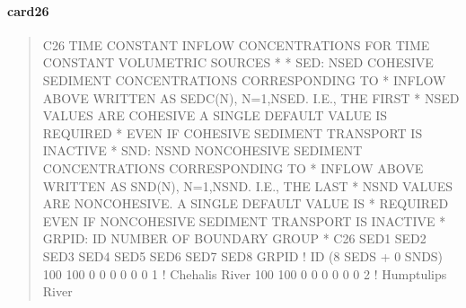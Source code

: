 \documentclass[letterpaper,10pt,english]{sphinxmanual}
\begin{document}
\paragraph{card26}
\label{\detokenize{inputfiles/runcontrol/card26:card26}}\label{\detokenize{inputfiles/runcontrol/card26::doc}}\begin{quote}

\begin{sphinxVerbatim}[commandchars=\\\{\}]
\PYGZhy{}\PYGZhy{}\PYGZhy{}\PYGZhy{}\PYGZhy{}\PYGZhy{}\PYGZhy{}\PYGZhy{}\PYGZhy{}\PYGZhy{}\PYGZhy{}\PYGZhy{}\PYGZhy{}\PYGZhy{}\PYGZhy{}\PYGZhy{}\PYGZhy{}\PYGZhy{}\PYGZhy{}\PYGZhy{}\PYGZhy{}\PYGZhy{}\PYGZhy{}\PYGZhy{}\PYGZhy{}\PYGZhy{}\PYGZhy{}\PYGZhy{}\PYGZhy{}\PYGZhy{}\PYGZhy{}\PYGZhy{}\PYGZhy{}\PYGZhy{}\PYGZhy{}\PYGZhy{}\PYGZhy{}\PYGZhy{}\PYGZhy{}\PYGZhy{}\PYGZhy{}\PYGZhy{}\PYGZhy{}\PYGZhy{}\PYGZhy{}\PYGZhy{}\PYGZhy{}\PYGZhy{}\PYGZhy{}\PYGZhy{}\PYGZhy{}\PYGZhy{}\PYGZhy{}\PYGZhy{}\PYGZhy{}\PYGZhy{}\PYGZhy{}\PYGZhy{}\PYGZhy{}\PYGZhy{}\PYGZhy{}\PYGZhy{}\PYGZhy{}\PYGZhy{}\PYGZhy{}\PYGZhy{}\PYGZhy{}\PYGZhy{}\PYGZhy{}\PYGZhy{}\PYGZhy{}\PYGZhy{}\PYGZhy{}\PYGZhy{}\PYGZhy{}\PYGZhy{}\PYGZhy{}\PYGZhy{}
C26 TIME CONSTANT INFLOW CONCENTRATIONS FOR TIME CONSTANT VOLUMETRIC SOURCES
*
*    SED: NSED COHESIVE SEDIMENT CONCENTRATIONS CORRESPONDING TO
*         INFLOW ABOVE  WRITTEN AS SEDC(N), N=1,NSED. I.E., THE FIRST
*         NSED VALUES ARE COHESIVE A SINGLE DEFAULT VALUE IS REQUIRED
*         EVEN IF COHESIVE SEDIMENT TRANSPORT IS INACTIVE
*    SND: NSND NON\PYGZhy{}COHESIVE SEDIMENT CONCENTRATIONS CORRESPONDING TO
*         INFLOW ABOVE  WRITTEN AS SND(N), N=1,NSND. I.E., THE LAST
*         NSND VALUES ARE NON\PYGZhy{}COHESIVE. A SINGLE DEFAULT VALUE IS
*         REQUIRED EVEN IF NON\PYGZhy{}COHESIVE SEDIMENT TRANSPORT IS INACTIVE
*  GRPID: ID NUMBER OF BOUNDARY GROUP
*
C26      SED1      SED2      SED3      SED4      SED5      SED6      SED7      SED8      GRPID ! ID (8 SEDS + 0 SNDS)
          100       100         0         0         0         0         0         0          1 ! Chehalis River
          100       100         0         0         0         0         0         0          2 ! Humptulips River
\end{sphinxVerbatim}
\end{quote}
\end{document}
